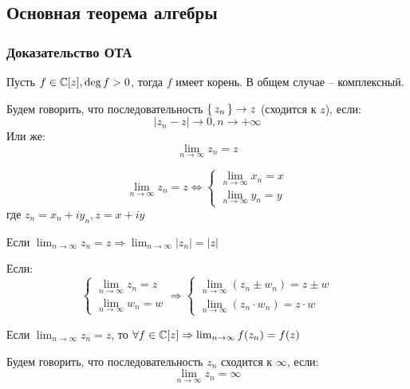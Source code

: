 \subsection{Основная теорема алгебры}
\subsubsection{Доказательство ОТА}
\begin{theorem}
\label{theorem:02_3}
  Пусть $f \in \mathbb{C}[z], \deg f > 0$, тогда $f$ имеет корень. В общем случае -- комплексный.
\end{theorem}
\begin{definition}
  Будем говорить, что последовательность $\set{z_n} \rightarrow z$ (сходится к $z$), если:
  \[
    \left|z_n - z\right| \rightarrow 0, n \rightarrow +\infty
  \]
  Или же:
  \[
    \lim_{n\to \infty} z_n = z
  \]
\end{definition}
\begin{lemma}
  \label{lemma:02_1}
  \[
  \lim_{n\to \infty} z_n = z \iff \begin{cases}
  \lim_{n\to\infty} x_n = x \\
  \lim_{n\to\infty} y_n = y
  \end{cases} 
  \]
  где $z_n = x_n + iy_n, z = x + iy$
\end{lemma}
\begin{lemma}
  \label{lemma:02_2}
  Если $\lim_{n \to \infty} z_n = z \Rightarrow \lim_{n\to \infty} \left|z_n\right| = \left|z\right|$
\end{lemma}
\begin{lemma}
  \label{lemma:02_3}
  Если:
  \[
  \begin{cases}
  \lim_{n\to \infty} z_n = z \\
  \lim_{n\to \infty} w_n = w
  \end{cases} \Rightarrow \begin{cases}
    \lim_{n\to \infty} (z_n \pm w_n) = z \pm w \\
    \lim_{n\to \infty} (z_n \cdot w_n) = z \cdot w
  \end{cases}
  \]
\end{lemma}
\begin{consequence}
  \label{consequence:02_3}
  Если $\lim_{n\to \infty} z_n = z$, то $\forall f \in \mathbb{C}[z] \Rightarrow \lim_{n\to\infty} f(z_n) = f(z)$
\end{consequence}
\begin{definition}
Будем говорить, что последовательность $z_n$ сходится к $\infty$, если:
\[
  \lim_{n\to \infty} z_n = \infty
\]
\end{definition} 
